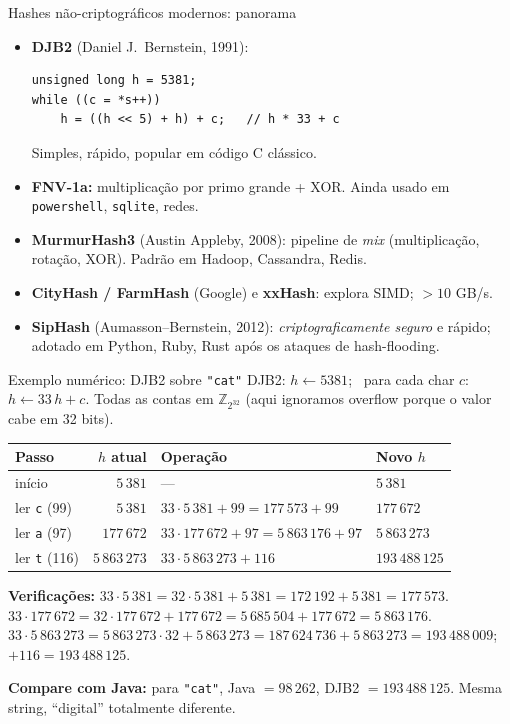 \documentclass[aspectratio=169]{beamer}
\begin{document}
\begin{frame}[fragile]{Hashes não-criptográficos modernos: panorama}
\begin{itemize}
\item \textbf{DJB2} (Daniel J.\ Bernstein, 1991):
\begin{verbatim}
unsigned long h = 5381;
while ((c = *s++))
    h = ((h << 5) + h) + c;   // h * 33 + c
\end{verbatim}
Simples, rápido, popular em código C clássico.

\item \textbf{FNV-1a:} multiplicação por primo grande + XOR. Ainda usado em \texttt{powershell}, \texttt{sqlite}, redes.

\item \textbf{MurmurHash3} (Austin Appleby, 2008): pipeline de \emph{mix} (multiplicação, rotação, XOR). Padrão em Hadoop, Cassandra, Redis.

\item \textbf{CityHash / FarmHash} (Google) e \textbf{xxHash}: explora SIMD; $> 10$ GB/s.

\item \textbf{SipHash} (Aumasson--Bernstein, 2012): \emph{criptograficamente seguro} e rápido; adotado em Python, Ruby, Rust após os ataques de hash-flooding.
\end{itemize}
\end{frame}

\begin{frame}[shrink=15]{Exemplo numérico: DJB2 sobre \texttt{"cat"}}
DJB2: $h \gets 5381$; \  para cada char $c$: \ $h \gets 33\,h + c$. Todas as contas em $\mathbb{Z}_{2^{32}}$ (aqui ignoramos overflow porque o valor cabe em 32 bits).

\smallskip
\centering
\begin{tabular}{lrll}
\toprule
Passo & $h$ atual & Operação & Novo $h$ \\
\midrule
início       & $5\,381$       & ---                              & $5\,381$ \\
ler \texttt{c} (99)   & $5\,381$       & $33 \cdot 5\,381 + 99 = 177\,573 + 99$    & $177\,672$ \\
ler \texttt{a} (97)   & $177\,672$     & $33 \cdot 177\,672 + 97 = 5\,863\,176 + 97$ & $5\,863\,273$ \\
ler \texttt{t} (116)  & $5\,863\,273$  & $33 \cdot 5\,863\,273 + 116$              & $193\,488\,125$ \\
\bottomrule
\end{tabular}

\smallskip
\textbf{Verificações:}
$33 \cdot 5\,381 = 32 \cdot 5\,381 + 5\,381 = 172\,192 + 5\,381 = 177\,573$.\\
$33 \cdot 177\,672 = 32 \cdot 177\,672 + 177\,672 = 5\,685\,504 + 177\,672 = 5\,863\,176$.\\
$33 \cdot 5\,863\,273 = 5\,863\,273 \cdot 32 + 5\,863\,273 = 187\,624\,736 + 5\,863\,273 = 193\,488\,009$; \  $+116 = 193\,488\,125$.

\smallskip
\textbf{Compare com Java:} para \texttt{"cat"}, Java $=98\,262$, DJB2 $=193\,488\,125$. Mesma string, ``digital'' totalmente diferente.
\end{frame}
\end{document}
